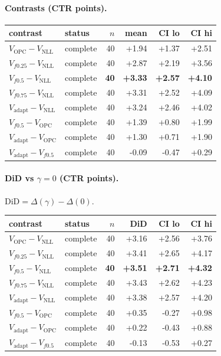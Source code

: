 \documentclass[10pt,a4paper]{article}
\begin{document}
\paragraph{Contrasts (CTR points).}
{\centering\small\begin{tabular}{llrrrr}
\toprule contrast & status & $n$ & mean & CI lo & CI hi \\
\midrule
$V_{\mathrm{OPC}}-V_{\mathrm{NLL}}$ & complete & 40 & +1.94 & +1.37 & +2.51 \\
$V_{f0.25}-V_{\mathrm{NLL}}$ & complete & 40 & +2.87 & +2.19 & +3.56 \\
\textbf{$V_{f0.5}-V_{\mathrm{NLL}}$} & complete & \textbf{40} & \textbf{+3.33} & \textbf{+2.57} & \textbf{+4.10} \\
$V_{f0.75}-V_{\mathrm{NLL}}$ & complete & 40 & +3.31 & +2.52 & +4.09 \\
$V_{\mathrm{adapt}}-V_{\mathrm{NLL}}$ & complete & 40 & +3.24 & +2.46 & +4.02 \\
$V_{f0.5}-V_{\mathrm{OPC}}$ & complete & 40 & +1.39 & +0.80 & +1.99 \\
$V_{\mathrm{adapt}}-V_{\mathrm{OPC}}$ & complete & 40 & +1.30 & +0.71 & +1.90 \\
$V_{\mathrm{adapt}}-V_{f0.5}$ & complete & 40 & -0.09 & -0.47 & +0.29 \\
\bottomrule\end{tabular}\par}
\paragraph{DiD vs $\gamma=0$ (CTR points).} $\mathrm{DiD}=\Delta(\gamma)-\Delta(0)$.
{\centering\small\begin{tabular}{llrrrr}
\toprule contrast & status & $n$ & DiD & CI lo & CI hi \\
\midrule
$V_{\mathrm{OPC}}-V_{\mathrm{NLL}}$ & complete & 40 & +3.16 & +2.56 & +3.76 \\
$V_{f0.25}-V_{\mathrm{NLL}}$ & complete & 40 & +3.41 & +2.65 & +4.17 \\
\textbf{$V_{f0.5}-V_{\mathrm{NLL}}$} & complete & \textbf{40} & \textbf{+3.51} & \textbf{+2.71} & \textbf{+4.32} \\
$V_{f0.75}-V_{\mathrm{NLL}}$ & complete & 40 & +3.43 & +2.62 & +4.23 \\
$V_{\mathrm{adapt}}-V_{\mathrm{NLL}}$ & complete & 40 & +3.38 & +2.57 & +4.20 \\
$V_{f0.5}-V_{\mathrm{OPC}}$ & complete & 40 & +0.35 & -0.27 & +0.98 \\
$V_{\mathrm{adapt}}-V_{\mathrm{OPC}}$ & complete & 40 & +0.22 & -0.43 & +0.88 \\
$V_{\mathrm{adapt}}-V_{f0.5}$ & complete & 40 & -0.13 & -0.53 & +0.27 \\
\bottomrule\end{tabular}\par}
\bigskip
\end{document}

